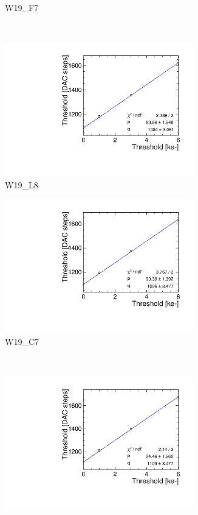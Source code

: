 \begin{figure}[htbp]
\begin{subfigure}[b]{0.45\textwidth}
    \caption{W19\_F7}
  \end{subfigure}\\
  \begin{subfigure}[b]{0.45\textwidth}
    \includegraphics[width=0.9\textwidth]{./figures/Calibration/THLcalibration_W0019_L08.pdf}
    \caption{W19\_L8}
  \end{subfigure} \hfill
  \begin{subfigure}[b]{0.45\textwidth}
    \includegraphics[width=0.9\textwidth]{./figures/Calibration/THLcalibration_W0019_C07.pdf}
    \caption{W19\_C7}
  \end{subfigure}\\
  \begin{subfigure}[b]{0.45\textwidth}
    \includegraphics[width=0.9\textwidth]{./figures/Calibration/THLcalibration_W0005_E02.pdf}

\end{subfigure}
\end{figure}
